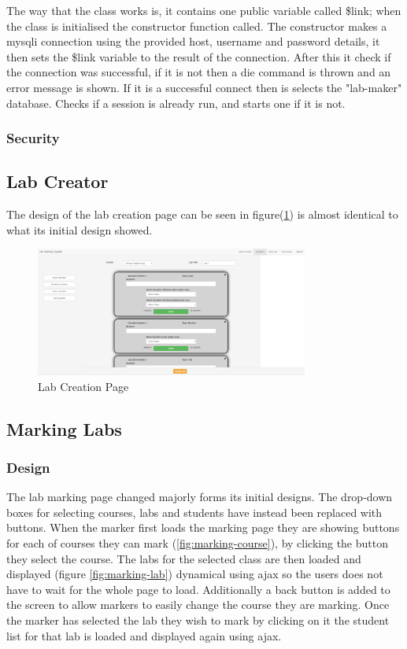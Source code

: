 \documentclass[12pt]{article}  %
\begin{document}
\noindent The way that the class works is, it contains one public variable called \$link; when the class is initialised the constructor function called. The constructor makes a mysqli connection using the provided host, username and password details, it then sets the \$link variable to the result of the connection. After this it check if the connection was successful, if it is not then a die command is thrown and an error message is shown. If it is a successful connect then is selects the "lab-maker" database. Checks if a session is already run, and starts one if it is not.

\subsubsection{Security}
\label{sec:security}





\subsection{Lab Creator}
The design of the lab creation page can be seen in figure(\ref{fig:lab-creator}) is almost identical to what its initial design showed. 

\begin{figure}[H]
    \centering
    \includegraphics[width=0.8\textwidth]{images/implementation/lab-creator-1-page.png}
    \caption{Lab Creation Page}
    \label{fig:lab-creator}
\end{figure}

\subsection{Marking Labs}


\subsubsection{Design}
The lab marking page changed majorly forms its initial designs. The drop-down boxes for selecting courses, labs and students have instead been replaced with buttons. When the marker first loads the marking page they are showing buttons for each of courses they can mark (\ref{fig:marking-course}), by clicking the button they select the course. The labs for the selected class are then loaded and displayed (figure \ref{fig:marking-lab}) dynamical using ajax so the users does not have to wait for the whole page to load. Additionally a back button is added to the screen to allow markers to easily change the course they are marking. Once the marker has selected the lab they wish to mark by clicking on it the student list for that lab is loaded and displayed again using ajax.
\end{document}
